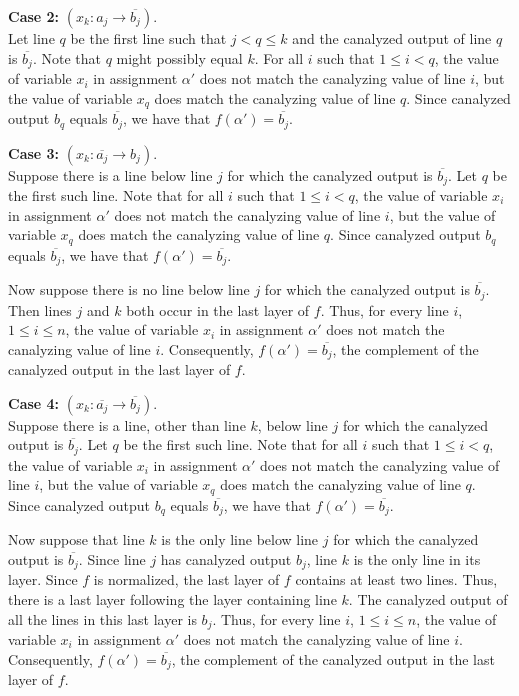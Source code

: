 {\bf Case 2:} $(x_k : a_j \rightarrow \overline{b_j})$. \\ Let line
$q$ be the first line such that $j < q \leq k$ and the canalyzed
output of line $q$ is $\overline{b_j}$.  Note that $q$ might possibly
equal $k$.  For all $i$ such that $1 \leq i < q$, the value of
variable $x_i$ in assignment $\alpha'$ does not match the canalyzing
value of line $i$, but the value of variable $x_q$ does match the
canalyzing value of line $q$.  Since canalyzed output $b_q$ equals
$\overline{b_j}$, we have that $f(\alpha') = \overline{b_j}$.

{\bf Case 3:} $(x_k : \overline{a_j} \rightarrow b_j)$. \\ Suppose
there is a line below line $j$ for which the canalyzed output is
$\overline{b_j}$.  Let $q$ be the first such line.  Note that for
all $i$ such that $1 \leq i < q$, the value of variable $x_i$ in
assignment $\alpha'$ does not match the canalyzing value of line
$i$, but the value of variable $x_q$ does match the canalyzing value
of line $q$.  Since canalyzed output $b_q$ equals $\overline{b_j}$,
we have that $f(\alpha') = \overline{b_j}$.

Now suppose there is no line below line $j$ for which the canalyzed
output is $\overline{b_j}$.  Then lines $j$ and $k$ both occur in
the last layer of $f$.  Thus, for every line $i$, $1 \leq i \leq
n$, the value of variable $x_i$ in assignment $\alpha'$ does not
match the canalyzing value of line $i$.  Consequently, $f(\alpha')
= \overline{b_j}$, the complement of the canalyzed output in the
last layer of $f$.

{\bf Case 4:} $(x_k : \overline{a_j} \rightarrow \overline{b_j})$.
\\ Suppose there is a line, other than line $k$, below line $j$ for
which the canalyzed output is $\overline{b_j}$.  Let $q$ be the
first such line.  Note that for all $i$ such that $1 \leq i < q$,
the value of variable $x_i$ in assignment $\alpha'$ does not match
the canalyzing value of line $i$, but the value of variable $x_q$
does match the canalyzing value of line $q$.  Since canalyzed output
$b_q$ equals $\overline{b_j}$, we have that $f(\alpha') =
\overline{b_j}$.

Now suppose that line $k$ is the only line below line $j$ for which
the canalyzed output is $\overline{b_j}$.  Since line $j$ has
canalyzed output $b_j$, line $k$ is the only line in its layer.
Since $f$ is normalized, the last layer of $f$ contains at least
two lines.  Thus, there is a last layer following the layer containing
line $k$.  The canalyzed output of all the lines in this last layer
is $b_j$.  Thus, for every line $i$, $1 \leq i \leq n$, the value
of variable $x_i$ in assignment $\alpha'$ does not match the
canalyzing value of line $i$.  Consequently, $f(\alpha') =
\overline{b_j}$, the complement of the canalyzed output in the last
layer of $f$.  \QED

